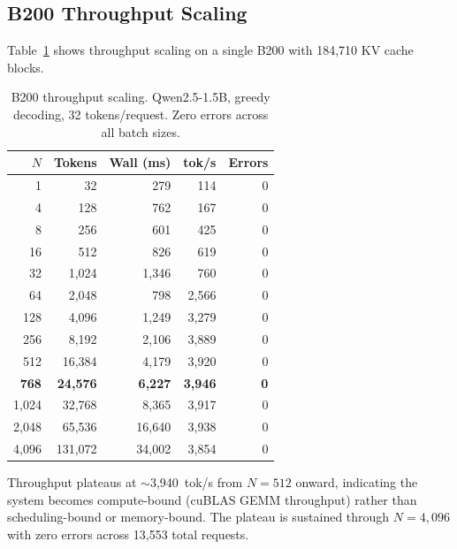 \documentclass[11pt,a4paper]{article}
\newcommand{\thead}[1]{\textbf{#1}}
\begin{document}
\subsection{B200 Throughput Scaling}

Table~\ref{tab:b200} shows throughput scaling on a single B200 with 184{,}710 KV
cache blocks.

\begin{table}[t]
  \centering
  \caption{B200 throughput scaling. Qwen2.5-1.5B, greedy decoding, 32 tokens/request. Zero errors across all batch sizes.}
  \label{tab:b200}
  \small
  \begin{tabular}{@{}rrrrr@{}}
    \toprule
    \rowcolor{HeaderBlue} \thead{$N$} & \thead{Tokens} & \thead{Wall (ms)} & \thead{tok/s} & \thead{Errors} \\
    \midrule
    1     & 32      & 279     & 114    & 0 \\
    \rowcolor{gray!8}
    4     & 128     & 762     & 167    & 0 \\
    8     & 256     & 601     & 425    & 0 \\
    \rowcolor{gray!8}
    16    & 512     & 826     & 619    & 0 \\
    32    & 1{,}024  & 1{,}346 & 760    & 0 \\
    \rowcolor{gray!8}
    64    & 2{,}048  & 798     & 2{,}566 & 0 \\
    128   & 4{,}096  & 1{,}249 & 3{,}279 & 0 \\
    \rowcolor{gray!8}
    256   & 8{,}192  & 2{,}106 & 3{,}889 & 0 \\
    512   & 16{,}384 & 4{,}179 & 3{,}920 & 0 \\
    \rowcolor{gray!8}
    \textbf{768} & \textbf{24{,}576} & \textbf{6{,}227} & \textbf{3{,}946} & \textbf{0} \\
    1{,}024 & 32{,}768 & 8{,}365 & 3{,}917 & 0 \\
    \rowcolor{gray!8}
    2{,}048 & 65{,}536 & 16{,}640 & 3{,}938 & 0 \\
    4{,}096 & 131{,}072 & 34{,}002 & 3{,}854 & 0 \\
    \bottomrule
  \end{tabular}
\end{table}

Throughput plateaus at $\sim$3{,}940~tok/s from $N\!=\!512$ onward, indicating
the system becomes compute-bound (cuBLAS GEMM throughput) rather than
scheduling-bound or memory-bound. The plateau is sustained through $N\!=\!4{,}096$
with zero errors across 13{,}553 total requests.
\end{document}
